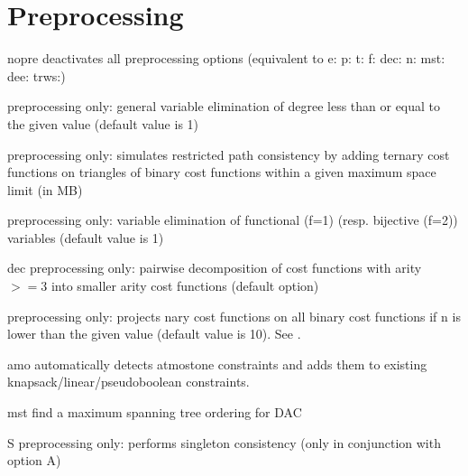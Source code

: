 \documentclass[letterpaper,10pt,openany,oneside,english]{sphinxmanual}
\begin{document}
\section{Preprocessing}
\label{\detokenize{userdoc:preprocessing}}\begin{optionlist}{3cm}
\item [\sphinxhyphen{}nopre]  
\sphinxAtStartPar
deactivates all preprocessing options (equivalent to \sphinxhyphen{}e:
\sphinxhyphen{}p: \sphinxhyphen{}t: \sphinxhyphen{}f: \sphinxhyphen{}dec: \sphinxhyphen{}n: \sphinxhyphen{}mst: \sphinxhyphen{}dee: \sphinxhyphen{}trws:)
\end{optionlist}
\begin{description}
\sphinxAtStartPar
preprocessing only: general variable elimination
of degree less than or equal to the given value (default value is \sphinxhyphen{}1)

\sphinxAtStartPar
preprocessing only: simulates restricted path
consistency by adding ternary cost functions on triangles of binary
cost functions within a given maximum space limit (in MB)

\sphinxAtStartPar
preprocessing only: variable elimination of
functional (f=1) (resp. bijective (f=2)) variables (default value is 1)

\end{description}
\begin{optionlist}{3cm}
\item [\sphinxhyphen{}dec]  
\sphinxAtStartPar
preprocessing only: pairwise decomposition  of cost
functions with arity \(>=3\) into smaller arity cost functions
(default option)
\end{optionlist}
\begin{description}
\sphinxAtStartPar
preprocessing only: projects n\sphinxhyphen{}ary cost functions
on all binary cost functions if n is lower than the given value
(default value is 10). See .

\end{description}
\begin{optionlist}{3cm}
\item [\sphinxhyphen{}amo]  
\sphinxAtStartPar
automatically detects at\sphinxhyphen{}most\sphinxhyphen{}one constraints and adds them to existing
knapsack/linear/pseudo\sphinxhyphen{}boolean constraints.
\item [\sphinxhyphen{}mst]  
\sphinxAtStartPar
find a maximum spanning tree ordering for DAC
\item [\sphinxhyphen{}S]  
\sphinxAtStartPar
preprocessing only: performs singleton consistency (only in
conjunction with option \sphinxhyphen{}A)
\end{optionlist}
\end{document}
